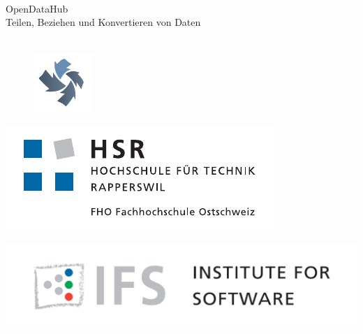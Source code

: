 
\author{
	\rlif \\
	\and
	\chuf \\
	\and
	\fscf \\
}

\clearpage
\begin{titlepage}
	
	\begin{center}
		 \\
		 \\ [25pt]
		\hr{1pt} \\[0.2cm]
		\huge OpenDataHub \\ Teilen, Beziehen und Konvertieren von Daten \\
		\hr{1pt} \\[0.2cm]
		
		\begin{figure}[H]
			\centering
			\includegraphics[width=0.2\textwidth]{fig/opendatahub-logo}
		\end{figure}
		
		\begin{minipage}{0.4\textwidth}
			\includegraphics[width=\textwidth]{fig/hsr-logo}
		\end{minipage}
		\begin{minipage}{0.4\textwidth}
			\includegraphics[width=\textwidth]{fig/ifs-logo}
		\end{minipage}
		

\end{center}
\end{titlepage}

